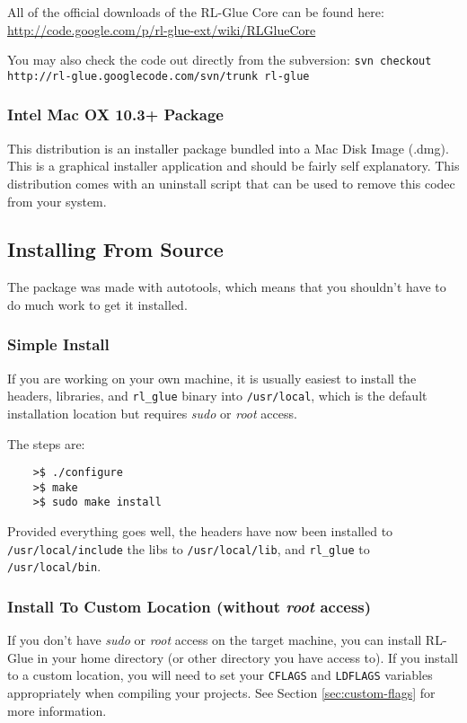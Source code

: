 \documentclass[11pt]{article}
\begin{document}
All of the official downloads of the RL-Glue Core can be found here:\newline
\url{http://code.google.com/p/rl-glue-ext/wiki/RLGlueCore}

You may also check the code out directly from the subversion:
\texttt{svn checkout http://rl-glue.googlecode.com/svn/trunk rl-glue}

\subsubsection{Intel Mac OX 10.3+ Package}
This distribution is an installer package bundled into a Mac Disk Image (.dmg).  This is a graphical installer application and should be fairly self explanatory. This distribution comes with an uninstall script that can be used to remove this codec from your system.

\subsection{Installing From Source}
The package was made with autotools, which means that you shouldn't have to do much work to get it installed.  

\subsubsection{Simple Install}
If you are working on your own machine, it is usually easiest to install the headers, libraries, and \texttt{rl\_glue} binary into \texttt{/usr/local}, which is the default 
installation location but requires \textit{sudo} or \textit{root} access.

The steps are:
\begin{verbatim}
	>$ ./configure
	>$ make
	>$ sudo make install
\end{verbatim}

Provided everything goes well, the headers have now been installed to \texttt{/usr/local/include} the libs to \texttt{/usr/local/lib}, and \texttt{rl\_glue} to \texttt{/usr/local/bin}.

\subsubsection{Install  To Custom Location (without \textit{root} access)}
If you don't have \textit{sudo} or \textit{root} access on the target machine, you can install RL-Glue in your home directory (or other directory you have access to).
If you install to a custom location, you will need to set your \texttt{CFLAGS} and \texttt{LDFLAGS} variables appropriately when compiling your projects. See Section \ref{sec:custom-flags} for more information.
\end{document}

